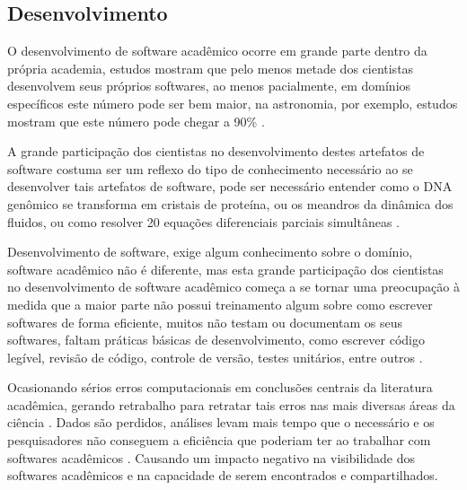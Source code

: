 \subsection{Desenvolvimento}

O desenvolvimento de software acadêmico ocorre em grande parte dentro da
própria academia, estudos mostram que pelo menos metade dos cientistas desenvolvem
seus próprios softwares, ao menos pacialmente, em domínios específicos este
número pode ser bem maior, na astronomia, por exemplo, estudos mostram que este
número pode chegar a 90\% \cite{hettrick_2014_14809, momcheva2015software}.


A grande participação dos cientistas no desenvolvimento destes artefatos de
software costuma ser um reflexo do tipo de conhecimento necessário ao se
desenvolver tais artefatos de software, pode ser necessário entender como o DNA
genômico se transforma em cristais de proteína, ou os meandros da dinâmica dos
fluidos, ou como resolver 20 equações diferenciais parciais simultâneas
\cite{segal2008developing}.

Desenvolvimento de software, exige algum conhecimento sobre o domínio, software
acadêmico não é diferente, mas esta grande participação dos cientistas no
desenvolvimento de software acadêmico começa a se tornar uma preocupação à
medida que a maior parte não possui treinamento algum sobre como escrever
softwares de forma eficiente, muitos não testam ou documentam os seus
softwares, faltam práticas básicas de desenvolvimento, como escrever código
legível, revisão de código, controle de versão, testes unitários, entre outros
\cite{wilson2017good}.

Ocasionando sérios erros computacionais em conclusões centrais da literatura
acadêmica, gerando retrabalho para retratar tais erros nas mais diversas áreas
da ciência \cite{Merali2010Computational}. Dados são perdidos, análises levam
mais tempo que o necessário e os pesquisadores não conseguem a eficiência que
poderiam ter ao trabalhar com softwares acadêmicos \cite{wilson2017good}.
Causando um impacto negativo na visibilidade dos softwares acadêmicos
\cite{howison2013, katz2014transitive} e na capacidade de serem encontrados e
compartilhados.


